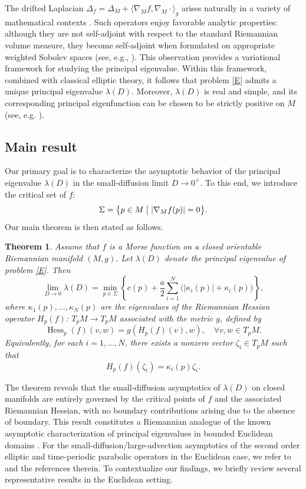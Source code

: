 \documentclass[12pt,reqno]{amsart}
\newtheorem{theorem}{Theorem}[section]
\numberwithin{equation}{section}
\begin{document}
The drifted Laplacian $\Delta_f=\Delta_{M}+\langle  \nabla_M f, \nabla_M \cdot\rangle_g$ arises naturally in a variety of mathematical contexts \cite{zhoudetang,book,CCL6,CCL7,GT}. Such operators enjoy favorable analytic properties: although they are not self-adjoint with respect to the standard Riemannian volume measure, they become self-adjoint when formulated on appropriate weighted Sobolev spaces (see, e.g., \cite{zhoudetang}). This observation provides a variational framework for studying the principal eigenvalue. Within this framework, combined with classical elliptic theory, it follows that problem \eqref{E} admits a unique principal eigenvalue $\lambda(D)$. Moreover, $\lambda(D)$ is real and simple, and its corresponding principal eigenfunction   can be chosen to be strictly positive on $M$ (see, e.g.  \cite{RGA}).

\subsection{Main result}

Our primary goal is to characterize the asymptotic behavior of the principal eigenvalue $\lambda(D)$ in the small-diffusion limit $D \to 0^+$. To this end, we introduce the critical set of $f$:
\[
\Sigma = \bigl\{ p \in M \bigm| |\nabla_M f(p)| = 0 \bigr\}.
\]
Our main theorem is then stated as follows.

\begin{theorem}\label{smalld}
Assume that $f$ is a Morse function on a closed orientable Riemannian manifold $(M,g)$. Let $\lambda(D)$ denote the principal eigenvalue of problem \eqref{E}. Then
\[
\lim_{D \to 0} \lambda(D)
= \min_{p \in \Sigma} \left\{ c(p) + \frac{a}{2} \sum_{i=1}^N \bigl( |\kappa_i(p)| + \kappa_i(p) \bigr) \right\},
\]
where $\kappa_1(p), \ldots, \kappa_N(p)$ are the eigenvalues of the Riemannian Hessian operator $H_p(f)$: $T_p M\to T_p M$ associated with the metric $g$, defined by 
\[
\operatorname{Hess}_p (f)(v, w) =g(H_p(f)(v),w), 
\quad \forall  v,w\in T_p M.
\]
Equivalently, for each $i = 1, \ldots, N$, there exists a nonzero vector $\zeta_i \in T_p M$ such that
\[H_p(f)(\zeta_i)=\kappa_i(p)\zeta_i.
\]
\end{theorem}

The theorem reveals that the small-diffusion asymptotics of $\lambda(D)$ on closed manifolds are entirely governed by the critical points of $f$ and the associated Riemannian Hessian, with no boundary contributions arising due to the absence of boundary. This result constitutes a Riemannian analogue of the known asymptotic characterization of principal eigenvalues in bounded Euclidean domains \cite{FA7273,DEF73,DF78,FS97,CL12,PZZ19,XZ26}. For the small-diffusion/large-advection  asymptotics of the second order elliptic and time-periodic parabolic operators in the Euclidean case, we refer to \cite{Bcmp,CL,LLPZ,LLPZd,LLPZx,PZhao} and the references therein. To contextualize our findings, we briefly review several representative results in the Euclidean setting.
\end{document}
